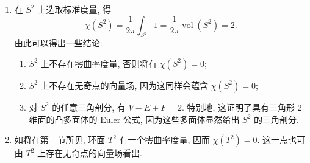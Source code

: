 \begin{RiemannExample}\label{ex:euler-characteristics-of-sphere-and-torus}
\begin{enumerate}[label=(\arabic*),leftmargin=*]
\item 在 $S^2$ 上选取标准度量, 得
\[
  \chi(S^2)=\frac1{2\pi}\int_{S^2}1=\frac1{2\pi}\operatorname{vol}(S^2)=2.
\]
由此可以得出一些结论:
\begin{enumerate}[label=(\alph*),leftmargin=*]
\item $S^2$ 上不存在零曲率度量, 否则将有 $\chi(S^2)=0$;
\item $S^2$ 上不存在无奇点的向量场, 因为这同样会蕴含 $\chi(S^2)=0$;
\item 对 $S^2$ 的任意三角剖分, 有 $V-E+F=2$. 特别地, 这证明了具有三角形 2 维面的凸多面体的 Euler 公式, 因为这些多面体显然给出 $S^2$ 的三角剖分.
\end{enumerate}
\item 如将在第~~节所见, 环面 $T^2$ 有一个零曲率度量, 因而 $\chi(T^2)=0$. 这一点也可由 $T^2$ 上存在无奇点的向量场看出.
\end{enumerate}
\end{RiemannExample}

